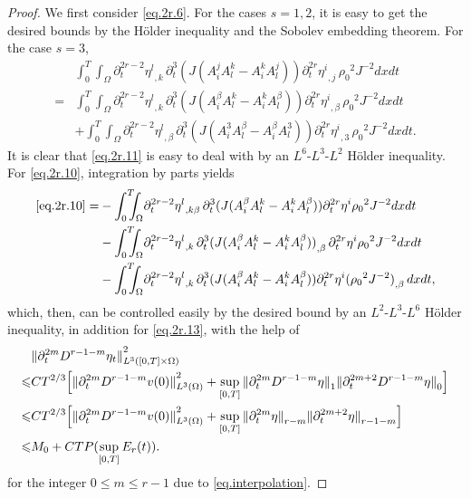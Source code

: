 \documentclass[12pt,twoside,reqno]{amsart}
\numberwithin{equation}{section}
\theoremstyle{definition}
\theoremstyle{remark}
\begin{document}
\begin{proof}
We first consider \eqref{eq.2r.6}. For the cases $s=1,2$, it is easy to get the desired bounds by the H\"older inequality and the Sobolev embedding theorem. For the case $s=3$,
\begin{align}
  &{\int_0^T\!\!\!\!\int_\Omega } {\partial}_t^{2r-2}{{{\eta^l}}_{,{k}}\,}{\partial}_t^3(J(A_i^jA_l^k-A_i^kA_l^j)) {{{{\partial}_t^{2r}\eta^i}}_{,{j}}\,}{\rho_0}^2  J^{-2}dxdt\label{eq.2r.9}\\
  =&{\int_0^T\!\!\!\!\int_\Omega } {\partial}_t^{2r-2}{{{\eta^l}}_{,{k}}\,}{\partial}_t^3(J(A_i^\beta A_l^k-A_i^kA_l^\beta)) {{{{\partial}_t^{2r}\eta^i}}_{,{\beta}}\,}{\rho_0}^2  J^{-2}dxdt\label{eq.2r.10}\\
  &+{\int_0^T\!\!\!\!\int_\Omega } {\partial}_t^{2r-2}{{{\eta^l}}_{,{\beta}}\,}{\partial}_t^3(J(A_i^3A_l^\beta-A_i^\beta A_l^3)) {{{{\partial}_t^{2r}\eta^i}}_{,{3}}\,}{\rho_0}^2  J^{-2}dxdt.\label{eq.2r.11}
\end{align}
It is clear that \eqref{eq.2r.11} is easy to deal with by an $L^6$-$L^3$-$L^2$ H\"older inequality. For \eqref{eq.2r.10}, integration by parts yields
\begin{align}
  \eqref{eq.2r.10}=&-{\int_0^T\!\!\!\!\int_\Omega } {\partial}_t^{2r-2}{{{\eta^l}}_{,{k\beta}}\,}{\partial}_t^3(J(A_i^\beta A_l^k-A_i^kA_l^\beta)) {\partial}_t^{2r}\eta^i{\rho_0}^2  J^{-2}dxdt\label{eq.2r.12}\\
  &-{\int_0^T\!\!\!\!\int_\Omega } {\partial}_t^{2r-2}{{{\eta^l}}_{,{k}}\,}{\partial}_t^3{{{(J(A_i^\beta A_l^k-A_i^kA_l^\beta))}}_{,{\beta}}\,} {\partial}_t^{2r}\eta^i{\rho_0}^2  J^{-2}dxdt\label{eq.2r.13}\\
  &-{\int_0^T\!\!\!\!\int_\Omega } {\partial}_t^{2r-2}{{{\eta^l}}_{,{k}}\,}{\partial}_t^3(J(A_i^\beta A_l^k-A_i^kA_l^\beta)) {\partial}_t^{2r}\eta^i{{{({\rho_0}^2  J^{-2})}}_{,{\beta}}\,}dxdt,\label{eq.2r.14}
\end{align}
which, then, can be controlled easily by the desired bound by an $L^2$-$L^3$-$L^6$ H\"older inequality, in addition for \eqref{eq.2r.13}, with the help of
\begin{align}
  &{\Vert{{\partial}_t^{2m}D^{r-1-m}\eta_t}\Vert}_{L^3([0,T]\times\Omega)}^2{\nonumber}\\
  {\leqslant}& CT^{2/3}\Big[{\Vert{{\partial}_t^{2m}D^{r-1-m}v(0)}\Vert}_{L^3(\Omega)}^2 +\sup_{[0,T]}{\Vert{ {\partial}_t^{2m}D^{r-1-m}\eta}\Vert}_1{\Vert{{\partial}_t^{2m+2}D^{r-1-m}\eta}\Vert}_0\Big]{\nonumber}\\
  {\leqslant}& CT^{2/3}\Big[{\Vert{{\partial}_t^{2m}D^{r-1-m}v(0)}\Vert}_{L^3(\Omega)}^2 +\sup_{[0,T]}{\Vert{ {\partial}_t^{2m}\eta}\Vert}_{r-m}{\Vert{{\partial}_t^{2m+2}\eta}\Vert}_{r-1-m}\Big]{\nonumber}\\
  {\leqslant}& M_0+CTP(\sup_{[0,T]}E_r(t)).\label{eq.vL3}
\end{align}
for the integer $0{\leqslant} m {\leqslant} r-1$ due to \eqref{eq.interpolation}.


\end{proof}
\end{document}
